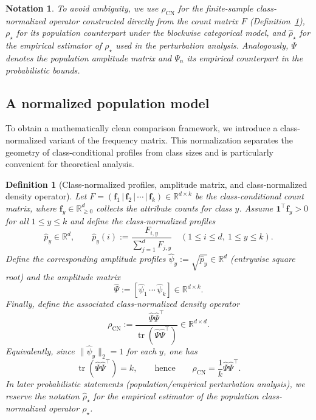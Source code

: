 \documentclass[preprint,11pt]{elsarticle}
\newtheorem{Definition}[Theorem]{Definition}
\newtheorem{Notation}[Theorem]{Notation}
\newcommand{\tr}{\operatorname{tr}}
\newcommand{\R}{\mathbb{R}}
\begin{document}
\begin{Notation}
    To avoid ambiguity, we use $\rho_{\mathrm{CN}}$ for the finite-sample class-normalized operator constructed directly from the count matrix $F$
    (Definition~\ref{def:class_normalized_profiles}), $\rho_\star$ for its population counterpart under the blockwise categorical model, and
    $\widehat\rho_\star$ for the empirical estimator of $\rho_\star$ used in the perturbation analysis. Analogously, $\Psi$ denotes the population
    amplitude matrix and $\Psi_n$ its empirical counterpart in the probabilistic bounds.
\end{Notation}

\subsection{A normalized population model}
\label{subsec:normalized_population_model}

To obtain a mathematically clean comparison framework, we introduce a class-normalized variant of the frequency matrix.
This normalization separates the geometry of class-conditional profiles from class sizes and is particularly convenient for theoretical analysis.

\begin{Definition}[Class-normalized profiles, amplitude matrix, and class-normalized density operator]
\label{def:class_normalized_profiles}
Let $F=(\mathbf f_1\,|\,\mathbf f_2\,|\,\cdots\,|\,\mathbf f_k)\in\R^{d\times k}$ be the class-conditional count matrix, where
$\mathbf f_y\in\R_{\ge 0}^d$ collects the attribute counts for class $y$.
Assume $\mathbf 1^\top \mathbf f_y>0$ for all $1\le y\le k$ and define the class-normalized profiles
\[
\widehat p_y \in \R^d,\qquad
\widehat p_y(i):=\frac{F_{i,y}}{\sum_{j=1}^d F_{j,y}}
\quad (1\le i\le d,\ 1\le y\le k).
\]
Define the corresponding \emph{amplitude profiles} $\widehat\psi_y:=\sqrt{\widehat p_y}\in\R^d$ (entrywise square root) and the
amplitude matrix
\[
\widehat\Psi := [\widehat\psi_1\,\cdots\,\widehat\psi_k]\in\R^{d\times k}.
\]
Finally, define the associated \emph{class-normalized density operator}
\[
\rho_{\mathrm{CN}}
:= \frac{\widehat\Psi\widehat\Psi^\top}{\tr(\widehat\Psi\widehat\Psi^\top)}
\in\R^{d\times d}.
\]
Equivalently, since $\|\widehat\psi_y\|_2=1$ for each $y$, one has
\[
\tr(\widehat\Psi\widehat\Psi^\top)=k,
\qquad\text{hence}\qquad
\rho_{\mathrm{CN}}=\frac{1}{k}\widehat\Psi\widehat\Psi^\top.
\]
In later probabilistic statements (population/empirical perturbation analysis), we reserve the notation
$\widehat\rho_\star$ for the empirical estimator of the population class-normalized operator $\rho_\star$.
\end{Definition}
\end{document}
